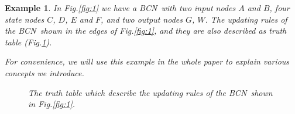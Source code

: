 \documentclass[conference]{IEEEtran} %
\newtheorem{example}{Example}
\def \BCN {{\em BCN}}
\begin{document}
\begin{example}
	In {\em  Fig.\ref{fig:1}} we have a \BCN\ with two input nodes $A$ and $B$, four state nodes $C$, $D$, $E$ and $F$, and two output nodes $G$, $W$. The updating rules of the \BCN\ shown in the edges of {\em Fig.\ref{fig:1}}, and they are also described as truth table ({\em Fig.\ref{fig:2}}). 
	
	For convenience, we will use this example in the whole paper to explain various concepts we introduce.
  \begin{figure}[thpb]
      \centering
      
      \caption{The truth table which describe the updating rules of the \BCN\ shown in {\em Fig.\ref{fig:1}}.}
      \label{fig:2}
   \end{figure}
\end{example}   


\end{document}
